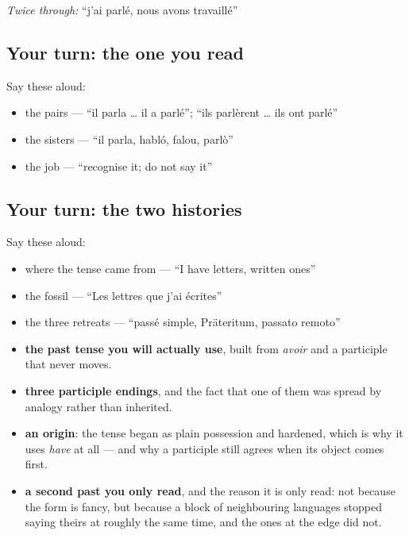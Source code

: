 \emph{Twice through:} \textquotedblleft{}j'ai parlé, nous avons travaillé\textquotedblright{}

\subsection*{Your turn: the one you read}
Say these aloud:

\begin{itemize}
\raggedright
  \item the pairs — \textquotedblleft{}il parla … il a parlé\textquotedblright{}; \textquotedblleft{}ils parlèrent … ils ont parlé\textquotedblright{}
  \item the sisters — \textquotedblleft{}il parla, habló, falou, parlò\textquotedblright{}
  \item the job — \textquotedblleft{}recognise it; do not say it\textquotedblright{}
\end{itemize}

\subsection*{Your turn: the two histories}
Say these aloud:

\begin{itemize}
\raggedright
  \item where the tense came from — \textquotedblleft{}I have letters, written ones\textquotedblright{}
  \item the fossil — \textquotedblleft{}Les lettres que j'ai écrites\textquotedblright{}
  \item the three retreats — \textquotedblleft{}passé simple, Präteritum, passato remoto\textquotedblright{}
\end{itemize}

\begin{grammarlens}[title={What you've built this chapter}]
\begin{itemize}
\raggedright
  \item \textbf{the past tense you will actually use}, built from \emph{avoir} and a participle that never moves.
  \item \textbf{three participle endings}, and the fact that one of them was spread by analogy rather than inherited.
  \item \textbf{an origin}: the tense began as plain possession and hardened, which is why it uses \emph{have} at all — and why a participle still agrees when its object comes first.
  \item \textbf{a second past you only read}, and the reason it is only read: not because the form is fancy, but because a block of neighbouring languages stopped saying theirs at roughly the same time, and the ones at the edge did not.
\end{itemize}
\end{grammarlens}


